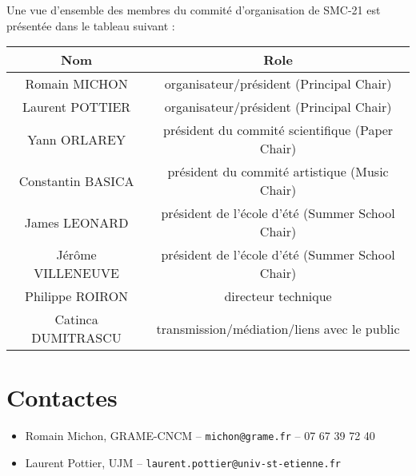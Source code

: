 \documentclass[fontsize=12pt]{scrartcl} %
\numberwithin{equation}{section} %
\numberwithin{figure}{section} %
\numberwithin{table}{section} %
\begin{document}
Une vue d'ensemble des membres du commité d'organisation de SMC-21 est présentée dans le tableau suivant :

\begin{table}[!htbp]
  \begin{center}
    \begin{tabular}{c | c}
      \textbf{Nom} & \textbf{Role} \\
      \hline
      \hline
      Romain MICHON & organisateur/président (Principal Chair) \\
      Laurent POTTIER & organisateur/président (Principal Chair) \\
      Yann ORLAREY & président du commité scientifique (Paper Chair) \\
      Constantin BASICA & président du commité artistique (Music Chair) \\
      James LEONARD & président de l'école d'été (Summer School Chair) \\
      Jérôme VILLENEUVE & président de l'école d'été (Summer School Chair) \\
      Philippe ROIRON & directeur technique \\
      Catinca DUMITRASCU & transmission/médiation/liens avec le public \\
    \end{tabular}
  \end{center}
\end{table}

\section{Contactes}

\begin{itemize}
\item Romain Michon, GRAME-CNCM -- \texttt{michon@grame.fr} -- 07 67 39 72 40
\item Laurent Pottier, UJM -- \texttt{laurent.pottier@univ-st-etienne.fr} %
\end{itemize}
\end{document}

